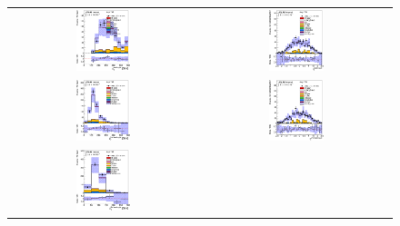 \clearpage
\begin{figure}[htbp]
\begin{center}
\begin{tabular}{cc}
%
\includegraphics[width=0.30\textwidth]{appendices/figures/sdrs/JetPt1_ELEMUONCR2_1W_NOMINAL.eps} &
\includegraphics[width=0.30\textwidth]{appendices/figures/sdrs/JetEta1_ELEMUONCR2_1W_NOMINAL.eps} \\
\includegraphics[width=0.30\textwidth]{appendices/figures/sdrs/JetPt2_ELEMUONCR2_1W_NOMINAL.eps} &
\includegraphics[width=0.30\textwidth]{appendices/figures/sdrs/JetEta2_ELEMUONCR2_1W_NOMINAL.eps} \\
\includegraphics[width=0.30\textwidth]{appendices/figures/sdrs/JetPt3_ELEMUONCR2_1W_NOMINAL.eps} &

\end{tabular}
\end{center}
\end{figure}
